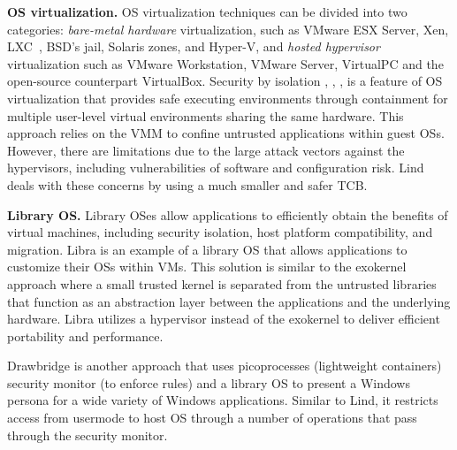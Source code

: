 
\textbf{OS virtualization.}
OS virtualization techniques can be divided into two categories:
\textit{bare-metal hardware} virtualization, such as VMware ESX Server, Xen,
LXC~\cite{LXC}, BSD’s jail, Solaris zones, and Hyper-V, and
\textit{hosted hypervisor} virtualization such as VMware
Workstation, VMware Server, VirtualPC and the open-source counterpart
VirtualBox.
%
Security by isolation \cite{Qubes}, \cite{Overshadow},
\cite{SecureVM}, \cite{HypSec} is a feature of OS virtualization that
provides safe executing environments through containment for multiple
user-level virtual environments sharing the same hardware. This
approach relies on the VMM to confine untrusted applications within
guest OSs. However, there are limitations due to
the large attack vectors against the hypervisors, including
vulnerabilities of software and configuration risk.
Lind deals with these concerns by using a much smaller and safer TCB.

\textbf{Library OS.}
Library OSes allow applications to efficiently
obtain the benefits of virtual machines,
including security isolation, host platform compatibility, and
migration. Libra \cite {Libra} is an example of a library OS that allows
applications to customize their OSs within VMs.
This solution is similar to the exokernel approach where a small trusted kernel
 is separated from the untrusted libraries
that function as an abstraction layer between the applications and the underlying hardware.
Libra utilizes a hypervisor instead of the exokernel to deliver efficient
portability and performance. 

Drawbridge \cite{Drawbridge-11} is another approach that uses picoprocesses
 (lightweight containers) security monitor (to enforce rules)
and a library OS to present a Windows persona for a wide variety of
Windows applications. Similar to Lind,
it restricts access from usermode to host OS through a number
of operations that pass through the security monitor.

